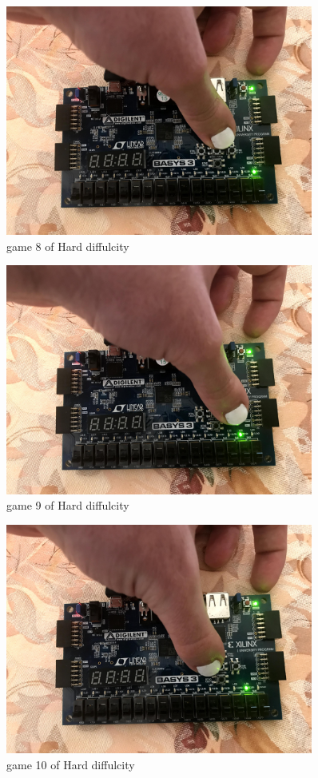 \documentclass[11pt]{article}
\begin{document}
\begin{figure}
	\includegraphics[width=0.9\textwidth]{IMG_1308.jpg}
	\caption{game 8 of Hard diffulcity }
	\label{fig:sim_with_table}
\end{figure}
\begin{figure}
	\includegraphics[width=0.9\textwidth]{IMG_1309.jpg}
	\caption{game 9 of Hard diffulcity }
	\label{fig:sim_with_table}
\end{figure}
\begin{figure}
	\includegraphics[width=0.9\textwidth]{IMG_1310.jpg}
	\caption{game 10 of Hard diffulcity }
	\label{fig:sim_with_table}
\end{figure}
\end{document}
